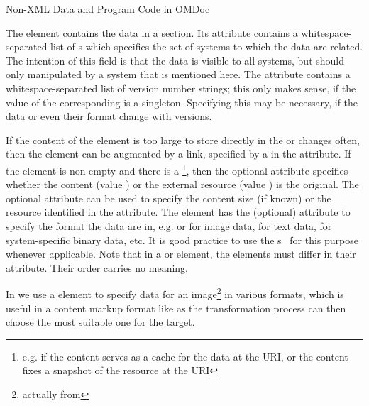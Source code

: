 \begin{module}[id=ext]
\begin{omgroup}[id=ext,short=Auxiliary Elements]
\begin{omgroup}[id=private]{Non-XML Data and Program Code in OMDoc}
\begin{definition}[id=data.def]
  The {} element contains the data in a {} section.  Its
   attribute contains a whitespace-separated list of
  {s} which specifies the set of systems to which the data are
  related.  The intention of this field is that the data is visible to all systems, but
  should only manipulated by a system that is mentioned here. The
   attribute contains a whitespace-separated list of
  version number strings; this only makes sense, if the value of the corresponding
   is a singleton. Specifying this may be necessary, if the data or
  even their format change with versions.

  If the content of the  element is too large to store directly in the
  \omdoc or changes often, then the  element can be augmented by a link,
  specified by a {} in the  attribute. If
  the  element is non-empty and there is a
  \footnote{e.g. if the  content serves as a cache
    for the data at the URI, or the  content fixes a snapshot of the
    resource at the URI}, then the optional attribute 
  specifies whether the  content (value )
  or the external resource (value ) is the
  original. The optional  attribute can be used to specify the
  content size (if known) or the resource identified in the 
  attribute. The  element has the (optional) attribute
   to specify the format the data are in, e.g.
   or  for image
  data,  for text data, 
  for system-specific binary data, etc. It is good practice to use the
  {s}~\cite{FreBor:MIME96} for this purpose whenever applicable.  Note
  that in a  or  element, the  elements
  must differ in their  attribute. Their order carries no
  meaning.
\end{definition}

In {} we use a  element to specify data for an
image\footnote{actually {} from {}} in various
formats, which is useful in a content markup format like \omdoc as the transformation
process can then choose the most suitable one for the target.


\end{omgroup}
\end{omgroup}
\end{module}
